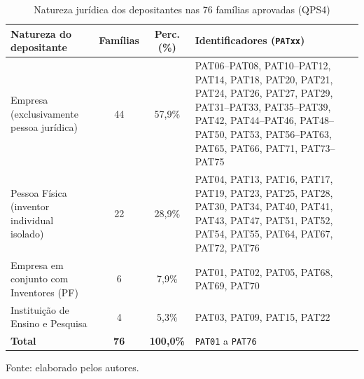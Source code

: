 \documentclass[12pt,a4paper]{article}
\begin{document}
\begin{table}[htbp]
\centering\small
\caption{Natureza jurídica dos depositantes nas 76 famílias aprovadas (QPS4)}\label{tab:natureza}
\begin{tabular}{p{4.3cm}ccp{5.9cm}}
\toprule
\textbf{Natureza do depositante} & \textbf{Famílias} & \textbf{Perc. (\%)} & \textbf{Identificadores (\texttt{PATxx})}\\
\midrule
Empresa (exclusivamente pessoa jurídica) & 44 & 57,9\% & PAT06--PAT08, PAT10--PAT12, PAT14, PAT18, PAT20, PAT21, PAT24, PAT26, PAT27, PAT29, PAT31--PAT33, PAT35--PAT39, PAT42, PAT44--PAT46, PAT48--PAT50, PAT53, PAT56--PAT63, PAT65, PAT66, PAT71, PAT73--PAT75\\
Pessoa Física (inventor individual isolado) & 22 & 28,9\% & PAT04, PAT13, PAT16, PAT17, PAT19, PAT23, PAT25, PAT28, PAT30, PAT34, PAT40, PAT41, PAT43, PAT47, PAT51, PAT52, PAT54, PAT55, PAT64, PAT67, PAT72, PAT76\\
Empresa em conjunto com Inventores (PF) & 6 & 7,9\% & PAT01, PAT02, PAT05, PAT68, PAT69, PAT70\\
Instituição de Ensino e Pesquisa & 4 & 5,3\% & PAT03, PAT09, PAT15, PAT22\\
\midrule
\textbf{Total} & \textbf{76} & \textbf{100,0\%} & \texttt{PAT01} a \texttt{PAT76}\\
\bottomrule
\end{tabular}

\smallskip
\footnotesize Fonte: elaborado pelos autores.
\end{table}
\end{document}
